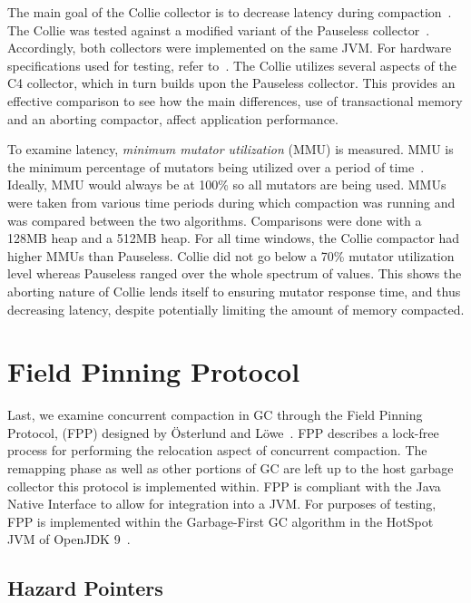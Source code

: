 \documentclass{sig-alternate}
\begin{document}
The main goal of the Collie collector is to decrease latency
during compaction~\cite{Iyengar:Collie}. The Collie was tested 
against a modified variant of the Pauseless collector~\cite{Click:Pauseless}.
Accordingly, both collectors were implemented on the same JVM. For hardware
specifications used for testing, refer to~\cite{Iyengar:Collie}. The Collie
utilizes several aspects of the C4 collector, which in turn builds upon the Pauseless
collector. This provides an effective comparison to see how the main differences, 
use of transactional memory and an aborting compactor, affect application performance. 

To examine latency, \emph{minimum mutator utilization} (MMU) is measured.
MMU is the minimum percentage of mutators being utilized over a period of time~\cite{Bacon:MMU}. Ideally,
MMU would always be at 100\% so all mutators are being used. 
MMUs were taken from various time periods during which
compaction was running and was compared between the two algorithms. Comparisons were done
with a 128MB heap and a 512MB heap. For all time windows, the Collie compactor
had higher MMUs than Pauseless. Collie did not go below a 70\% mutator utilization 
level whereas Pauseless ranged over the whole spectrum of values. 
This shows the aborting nature of Collie
lends itself to ensuring mutator response time, and thus decreasing latency, 
despite potentially limiting the amount of memory compacted.


\section{Field Pinning Protocol}
\label{sec:fpp}

Last, we examine concurrent compaction in GC through the Field Pinning
Protocol, (FPP) designed by \"{O}sterlund and L\"{o}we~\cite{Osterlund:FPP}.
FPP describes a lock-free process for performing the relocation aspect
of concurrent compaction. The remapping phase as well as other portions
of GC are left up to the host garbage collector this
protocol is implemented within. FPP is compliant with the Java Native Interface
to allow for integration into a JVM. For purposes of testing, FPP 
is implemented within the Garbage-First GC algorithm in the HotSpot JVM 
of OpenJDK 9~\cite{Detlefs:G1}.


\subsection{Hazard Pointers}
\label{sec:fppHazard}
\end{document}
